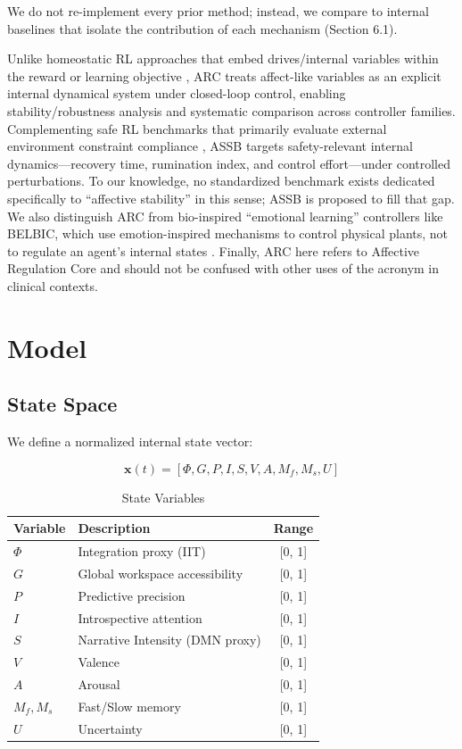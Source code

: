 \documentclass{article}
\begin{document}
We do not re-implement every prior method; instead, we compare to internal baselines that isolate the contribution of each mechanism (Section 6.1).

Unlike homeostatic RL approaches that embed drives/internal variables within the reward or learning objective \cite{Keramati2014}, ARC treats affect-like variables as an explicit internal dynamical system under closed-loop control, enabling stability/robustness analysis and systematic comparison across controller families. Complementing safe RL benchmarks that primarily evaluate external environment constraint compliance \cite{Leike2017, Ray2019, Ji2023}, ASSB targets safety-relevant internal dynamics---recovery time, rumination index, and control effort---under controlled perturbations. To our knowledge, no standardized benchmark exists dedicated specifically to ``affective stability'' in this sense; ASSB is proposed to fill that gap. We also distinguish ARC from bio-inspired ``emotional learning'' controllers like BELBIC, which use emotion-inspired mechanisms to control physical plants, not to regulate an agent's internal states \cite{Lucas2004}. Finally, ARC here refers to Affective Regulation Core and should not be confused with other uses of the acronym in clinical contexts.

\section{Model}

\subsection{State Space}

We define a normalized internal state vector:

\begin{equation}
\mathbf{x}(t) = [\Phi, G, P, I, S, V, A, M_f, M_s, U]
\end{equation}

\begin{table}[htbp]
\centering
\caption{State Variables}
\label{tab:state_variables}
\begin{tabular}{@{}llc@{}}
\toprule
Variable & Description & Range \\ \midrule
$\Phi$ & Integration proxy (IIT) & [0, 1] \\
$G$ & Global workspace accessibility & [0, 1] \\
$P$ & Predictive precision & [0, 1] \\
$I$ & Introspective attention & [0, 1] \\
$S$ & Narrative Intensity (DMN proxy) & [0, 1] \\
$V$ & Valence & [0, 1] \\
$A$ & Arousal & [0, 1] \\
$M_f, M_s$ & Fast/Slow memory & [0, 1] \\
$U$ & Uncertainty & [0, 1] \\ \bottomrule
\end{tabular}
\end{table}
\end{document}
